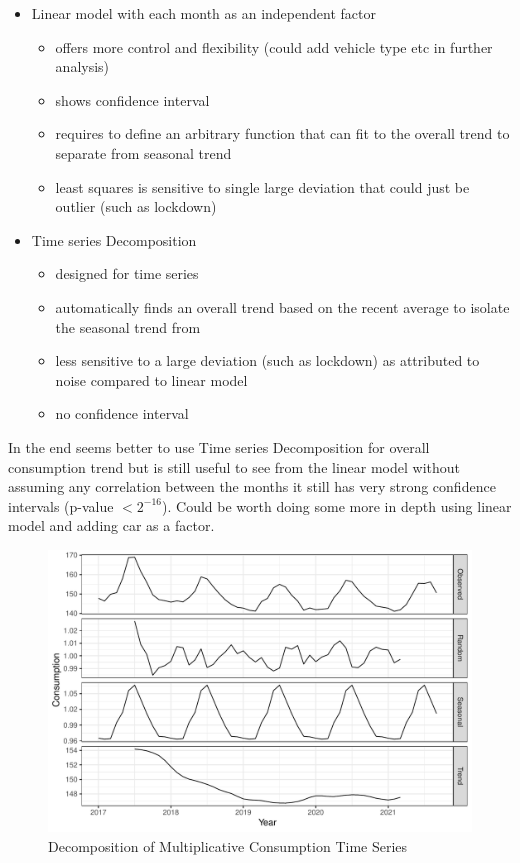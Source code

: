\documentclass[
]{article}
\begin{document}
\begin{itemize}
  \item Linear model with each month as an independent factor
  \begin{itemize}
    \item offers more control and flexibility (could add vehicle type etc in further analysis)
    \item shows confidence interval
    \item requires to define an arbitrary function that can fit to the overall trend to separate from seasonal trend
    \item least squares is sensitive to single large deviation that could just be outlier (such as lockdown)
  \end{itemize}
  \item Time series Decomposition
  \begin{itemize}
    \item designed for time series
    \item automatically finds an overall trend based on the recent average to isolate the seasonal trend from
    \item less sensitive to a large deviation (such as lockdown) as attributed to noise compared to linear model
    \item no confidence interval
  \end{itemize}
\end{itemize}

In the end seems better to use Time series Decomposition for overall
consumption trend but is still useful to see from the linear model
without assuming any correlation between the months it still has very
strong confidence intervals (p-value \(< 2^{-16}\)). Could be worth
doing some more in depth using linear model and adding car as a factor.

\begin{figure}
\centering
\includegraphics{summary_week4_files/figure-latex/eff_decomp_plot-1.pdf}
\caption{Decomposition of Multiplicative Consumption Time Series}
\end{figure}
\end{document}
